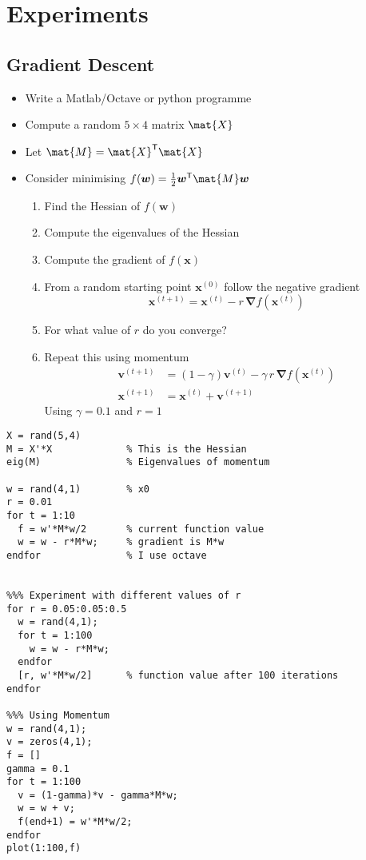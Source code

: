 \documentclass[11pt]{article}
\newcommand{\tr}{\textsf{T}}
\newcommand{\grad}{\bm{\nabla}}
\begin{document}
\section{Experiments}
\label{sec:orgcebc23b}

\subsection{Gradient Descent}
\label{sec:org705fb46}
\begin{itemize}
\item Write a Matlab/Octave or python programme
\item Compute a random \(5\times4\) matrix \(\mat{X}\)
\item Let \(\mat{M} = \mat{X}^\tr\mat{X}\)
\item Consider minimising \(f(\bm{w}) = \frac{1}{2} \bm{w}^\tr \mat{M} \bm{w}\)
\begin{enumerate}
\item Find the Hessian of \(f(\bm{w})\)
\item Compute the eigenvalues of the Hessian
\item Compute the gradient of \(f(\bm{x})\)
\item From a random starting point \(\bm{x}^{(0)}\) follow the negative gradient
$$ \bm{x}^{(t+1)} = \bm{x}^{(t)} - r\,\grad f(\bm{x}^{(t)}) $$
\item For what value of \(r\) do you converge?
\item Repeat this using momentum
\begin{align*}
\bm{v}^{(t+1)} &= (1-\gamma) \bm{v}^{(t)} -\gamma\, r\,\grad f(\bm{x}^{(t)}) \\
\bm{x}^{(t+1)} &= \bm{x}^{(t)} + \bm{v}^{(t+1)}
\end{align*}
Using \(\gamma=0.1\) and \(r=1\)
\end{enumerate}
\end{itemize}

\begin{verbatim}
X = rand(5,4)
M = X'*X             % This is the Hessian
eig(M)               % Eigenvalues of momentum

w = rand(4,1)        % x0
r = 0.01
for t = 1:10
  f = w'*M*w/2       % current function value
  w = w - r*M*w;     % gradient is M*w
endfor               % I use octave


%%% Experiment with different values of r
for r = 0.05:0.05:0.5
  w = rand(4,1);
  for t = 1:100
    w = w - r*M*w;
  endfor
  [r, w'*M*w/2]      % function value after 100 iterations
endfor

%%% Using Momentum
w = rand(4,1);
v = zeros(4,1);
f = []
gamma = 0.1
for t = 1:100
  v = (1-gamma)*v - gamma*M*w;
  w = w + v;
  f(end+1) = w'*M*w/2;
endfor
plot(1:100,f)
\end{verbatim}
\end{document}
